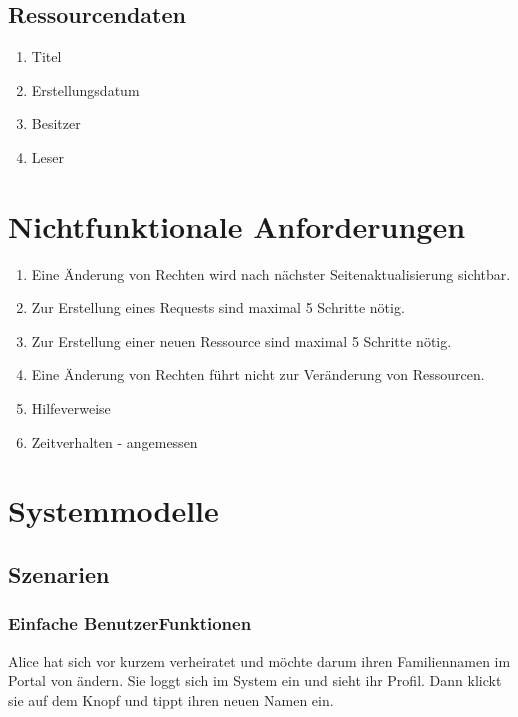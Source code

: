 \documentclass[parskip=full,11pt]{scrartcl}
\def\threedigits#1{%
  \ifnum#1<10 0\fi
  \ifnum#1<1 0\fi
  \number#1}
\begin{document}
\subsection{Ressourcendaten}
\begin{enumerate}[label={\textbf{/D\protect\threedigits{\theenumi}0/}}, leftmargin=*, resume]
		\item Titel
		\item Erstellungsdatum
		\item Besitzer
        	\item Leser     
\end{enumerate}

\section{Nichtfunktionale Anforderungen}
\begin{enumerate}[label={\textbf{/NF\protect\threedigits{\theenumi}0/}}, leftmargin=*]
\item Eine Änderung von Rechten wird nach nächster Seitenaktualisierung sichtbar.
\item Zur Erstellung eines Requests sind maximal 5 Schritte nötig.
\item Zur Erstellung einer neuen Ressource sind maximal 5 Schritte nötig.
\item Eine Änderung von Rechten führt nicht zur Veränderung von Ressourcen.
\item Hilfeverweise %
\item Zeitverhalten - angemessen %
\end{enumerate}


\section{Systemmodelle}

\subsection{Szenarien}
\subsubsection*{Einfache BenutzerFunktionen}
Alice hat sich vor kurzem verheiratet und möchte darum ihren Familiennamen im Portal von \grqq ändern. Sie loggt sich im System ein und sieht ihr Profil. Dann klickt sie auf dem Knopf \grqq und tippt ihren neuen Namen ein. 
\end{document}
